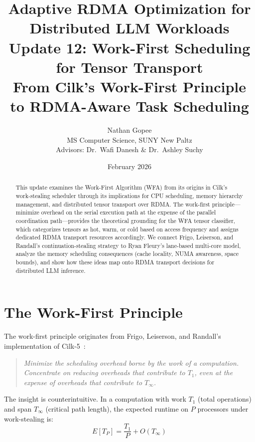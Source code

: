 \documentclass[11pt,letterpaper]{article}
\title{\textbf{Adaptive RDMA Optimization for Distributed LLM Workloads}\\[0.5em]
\large Update 12: Work-First Scheduling for Tensor Transport\\[0.3em]
\normalsize From Cilk's Work-First Principle to RDMA-Aware Task Scheduling}
\author{Nathan Gopee\\
MS Computer Science, SUNY New Paltz\\
Advisors: Dr.\ Wafi Danesh \& Dr.\ Ashley Suchy}
\date{February 2026}
\begin{document}
\maketitle

\begin{abstract}
\noindent
This update examines the Work-First Algorithm (WFA) from its origins in Cilk's work-stealing scheduler through its implications for CPU scheduling, memory hierarchy management, and distributed tensor transport over RDMA. The work-first principle---minimize overhead on the serial execution path at the expense of the parallel coordination path---provides the theoretical grounding for the WFA tensor classifier, which categorizes tensors as hot, warm, or cold based on access frequency and assigns dedicated RDMA transport resources accordingly. We connect Frigo, Leiserson, and Randall's continuation-stealing strategy to Ryan Fleury's lane-based multi-core model, analyze the memory scheduling consequences (cache locality, NUMA awareness, space bounds), and show how these ideas map onto RDMA transport decisions for distributed LLM inference.
\end{abstract}

\tableofcontents
\newpage

\section{The Work-First Principle}
\label{sec:principle}

The work-first principle originates from Frigo, Leiserson, and Randall's implementation of Cilk-5~\cite{frigo1998cilk5}:

\begin{quote}
\emph{Minimize the scheduling overhead borne by the work of a computation. Concentrate on reducing overheads that contribute to $T_1$, even at the expense of overheads that contribute to $T_\infty$.}
\end{quote}

The insight is counterintuitive. In a computation with work $T_1$ (total operations) and span $T_\infty$ (critical path length), the expected runtime on $P$ processors under work-stealing is:
\begin{equation}
    E[T_P] = \frac{T_1}{P} + O(T_\infty)
    \label{eq:workstealing}
\end{equation}
\end{document}
